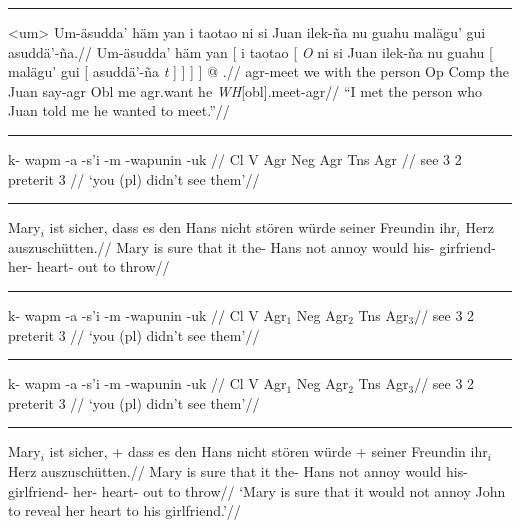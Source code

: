 \documentclass[12pt]{article}
\begin{document}
\hrule\medskip

\begingroup
\ex<um>
\begingl
\glpreamble Um-\"asudda' h\"am yan i taotao ni si Juan
ilek-\~na nu guahu mal\"agu' gui
asudd\"a'-\~na.//
\gla Um-\"asudda' h\"am yan [ i taotao [ {\it O\/} ni si Juan
ilek-\~na nu guahu [ mal\"agu' gui [ asudd\"a'-\~na {\it
t\/} ] ] ] ] @ .//
\glb agr-meet we with the person Op Comp the Juan say-agr Obl me
agr.want he {\it WH\/}[obl].meet-agr//
\glft ``I met the person who Juan told me he wanted to
meet.''//
\endgl
\xe
\endgroup
\bigskip

\hrule\medskip

\begingroup
\ex
\begingl[glspace=2em]
\gla[everygla=] k- wapm -a -s'i -m -wapunin -uk //
\glb[everyglb=\footnotesize,aboveglbskip=-.4ex]
   Cl V Agr Neg Agr Tns Agr //
 see 3 {} 2 preterit 3 //
\glft[everyglft=\it,aboveglftskip=0pt] `you (pl) didn't see them'//
\endgl
\xe
\endgroup
\bigskip

\hrule\medskip

\begingroup
\ex[exno={(6), p. 14},exnoformat={[X]}]
\begingl
\gla Mary$_i$ ist sicher, dass es den Hans nicht st\"oren w\"urde
seiner Freundin ihr$_i$ Herz auszusch\"utten.//
\glb Mary is sure that it the- Hans not annoy would
his- girfriend- her- heart- {out to
throw}//
\endgl
\xe
\endgroup
\bigskip

\hrule\medskip

\begingroup
\ex
\begingl
\gla \rightcomment{[Potawatami]}k- wapm -a -s'i -m -wapunin -uk //
\glb {}Cl V Agr$_1$ Neg Agr$_2$ Tns Agr$_3$//
 see 3 {} 2 preterit 3 //
\glft `you (pl) didn't see them'//
\endgl
\xe
\endgroup
\bigskip

\hrule\medskip

\begingroup
\hsize=3.5in
\ex
\rightcomment{[Potawatami]}
\begingl
\gla k- wapm -a -s'i -m -wapunin -uk //
\glb {}Cl V Agr$_1$ Neg Agr$_2$ Tns Agr$_3$//
 see 3 {} 2 preterit 3 //
\glft `you (pl) didn't see them'//
\endgl
\xe
\endgroup
\bigskip

\hrule\medskip

\begingroup
\ex
\begingl
\gla Mary$_i$ ist sicher, + dass es den Hans nicht st\"oren w\"urde
+ seiner Freundin ihr$_i$ Herz auszusch\"utten.//
\glb Mary is sure that it the- Hans not annoy would
his- girlfriend- her- heart- {out to
throw}//
\glft  `Mary is sure that it would not annoy John to reveal her
heart to his girlfriend.'//
\endgl
\xe
\endgroup
\bigskip
\end{document}
